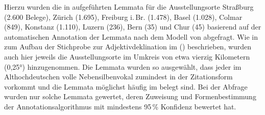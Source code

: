 Hierzu wurden die in  aufgeführten Lemmata für die
Ausstellungsorte
Straßburg (2.600 Belege),
% 
Zürich (1.695),
% 
Freiburg i.\,Br. (1.478),
% 
Basel (1.028),
% 
Colmar (849),
% 
Konstanz (1.110),
% 
Luzern (236),
% 
Bern (35)
% 
und Chur (45)
% 
basierend auf der automatischen Annotation der Lemmata nach dem
Modell von \citet{schmid2019} abgefragt. Wie in  zum
Aufbau der Stichprobe zur Adjektivdeklination im  (\CAO) beschrieben, wurden auch hier jeweils die
Ausstellungsorte im Umkreis von etwa vierzig Kilometern (0,25°) hinzugenommen.
Die Lemmata wurden so ausgewählt, dass jeder im
Althochdeutschen volle Nebensilbenvokal zumindest in der
Zitationsform vorkommt und die Lemmata möglichst häufig im \CAO{} belegt sind.
Bei der Abfrage wurden nur solche Lemmata gewertet, deren Zuweisung und
Formenbestimmung der Annotations\-algorithmus mit mindestens
95\,\% Konfidenz bewertet hat.

